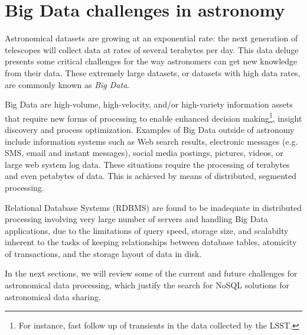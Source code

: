 \chapter{Big Data challenges in astronomy} %
\label{theproblem}

Astronomical datasets are growing at an exponential rate: the next generation of telescopes will collect data at rates of
several terabytes %
per day. This data
deluge %
presents some critical challenges for the way astronomers
can
get new knowledge from their data.
These extremely large datasets, or datasets with high data rates, are commonly known as
\emph{Big Data}.

Big Data are high-volume, high-velocity, and/or high-variety information assets that require new forms of processing to enable enhanced
decision making\footnote{For instance, fast follow up of transients in the data collected by the LSST.}, %
insight discovery and process optimization. Examples of Big Data
outside of astronomy
include information
systems
such as Web search results, electronic messages (e.g. SMS, email and instant messages), social media postings, pictures, videos, 
or large web %
system log data.
These situations require the %
processing of terabytes and even petabytes of data. This is achieved by
means of
distributed, segmented
processing.

Relational Database Systems (RDBMS)
are found to be inadequate in distributed processing involving very large number of servers and handling Big Data applications, due to the limitations of query speed, storage size, and scalabilty inherent to the tasks of keeping relationships between database tables, atomicity of transactions, and the storage layout of data in disk.


In the next sections, we will review some of the current and future challenges for astronomical data processing, which justify the search for NoSQL solutions for astronomical data sharing.

